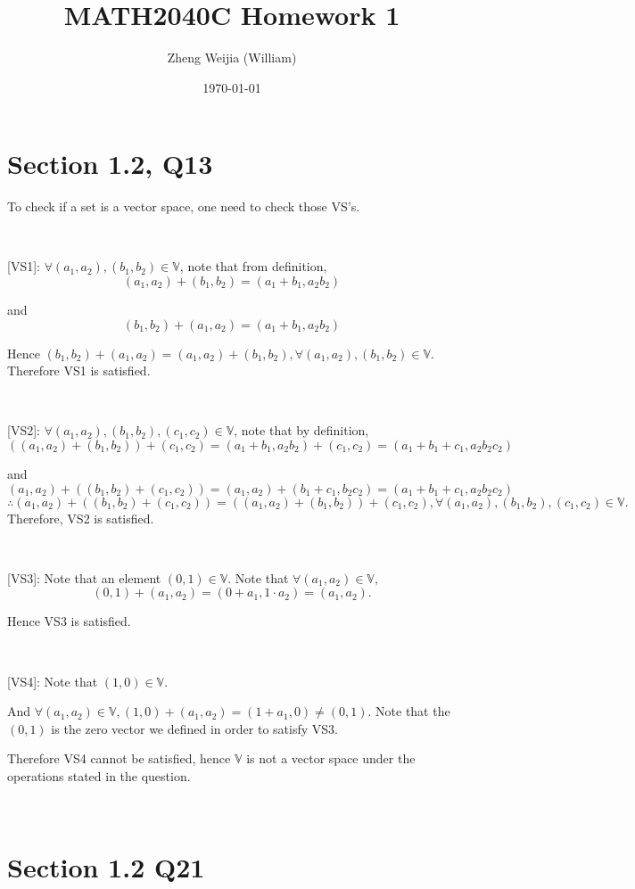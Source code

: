 \documentclass[12pt]{article}%
\begin{document}
\title{MATH2040C Homework 1}
\author{Zheng Weijia (William)}
\date{\today}
\maketitle

\section{Section 1.2, Q13}

To check if a set is a vector space, one need to check those VS's. 

~\

[VS1]: $\forall (a_1,a_2),(b_1,b_2) \in \mathbb{V}$, note that from definition, $$(a_1,a_2)+(b_1,b_2)=(a_1+b_1,a_2b_2)$$ 

and $$(b_1,b_2)+(a_1,a_2)=(a_1+b_1,a_2b_2)$$

Hence $(b_1,b_2)+(a_1,a_2) = (a_1,a_2)+(b_1,b_2), \forall (a_1,a_2),(b_1,b_2) \in \mathbb{V}.$ Therefore VS1 is satisfied.

~\

[VS2]: $\forall (a_1,a_2),(b_1,b_2),(c_1,c_2) \in \mathbb{V}$, note that by definition, $$((a_1,a_2)+(b_1,b_2))+(c_1,c_2)=(a_1+b_1,a_2b_2)+(c_1,c_2)=(a_1+b_1+c_1,a_2b_2c_2)$$

and $$(a_1,a_2)+((b_1,b_2)+(c_1,c_2)) = (a_1,a_2)+(b_1+c_1,b_2c_2)=(a_1+b_1+c_1,a_2b_2c_2)$$ $$\therefore (a_1,a_2)+((b_1,b_2)+(c_1,c_2)) = ((a_1,a_2)+(b_1,b_2))+(c_1,c_2), \forall (a_1,a_2),(b_1,b_2),(c_1,c_2) \in \mathbb{V}.$$ Therefore, VS2 is satisfied.

~\

[VS3]: Note that an element $(0,1)\in \mathbb{V}.$ Note that $\forall (a_1,a_2)\in \mathbb{V},$ $$(0,1)+(a_1,a_2)=(0+a_1,1\cdot a_2) = (a_1,a_2).$$

Hence VS3 is satisfied. 

~\

[VS4]: Note that $(1,0)\in \mathbb{V}.$ 

And $\forall (a_1,a_2)\in \mathbb{V}, (1,0)+(a_1,a_2)=(1+a_1,0)\neq (0,1).$ Note that the $(0,1)$ is the zero vector we defined in order to satisfy VS3.

Therefore VS4 cannot be satisfied, hence $\mathbb{V}$ is not a vector space under the operations stated in the question.

~\

\section{Section 1.2 Q21}
\end{document}
